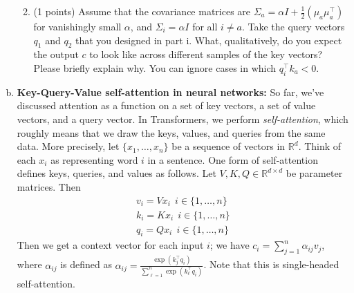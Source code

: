 \begin{enumerate}[(a)]
\begin{enumerate}[label=\roman*.]
    \begin{answer}
    \end{answer}

    \item (1 points) Assume that the covariance matrices are $\Sigma_a=\alpha I + \frac{1}{2}(\mu_a\mu_a^\top)$ for vanishingly small $\alpha$, and $\Sigma_i=\alpha I$  for all $i \neq a$.
    Take the query vectors $q_1$ and $q_2$ that you designed in part i.
    What, qualitatively, do you expect the output $c$ to look like across different samples of the key vectors? Please briefly explain why. You can ignore cases in which $q_i^\top k_a < 0$.

    \begin{answer}
    \end{answer}

    \end{enumerate}

\item {} \textbf{Key-Query-Value self-attention in neural networks:}
So far, we've discussed attention as a function on a set of key vectors, a set of value vectors, and a query vector.
In Transformers, we perform \textit{self-attention}, which roughly means that we draw the keys, values, and queries from the same data.
More precisely, let $\{x_1,\dots,x_n\}$ be a sequence of vectors in $\mathbb{R}^d$. 
Think of each $x_i$ as representing word $i$ in a sentence.
One form of self-attention defines keys, queries, and values as follows.
Let $V,K,Q \in \mathbb{R}^{d\times d}$ be parameter matrices. Then
\begin{align}
v_i = Vx_i\ \ i \in \{1,\dots,n\}\\
k_i = Kx_i\ \ i \in \{1,\dots,n\}\\
q_i = Qx_i\ \ i \in \{1,\dots,n\}
\end{align}
Then we get a context vector for each input $i$; we have $c_i = \sum_{j=1}^{n} \alpha_{ij} v_j$, where $\alpha_{ij}$ is defined as $\alpha_{ij} = \frac{\exp(k_j^\top q_i)}{\sum_{\ell=1}^{n}\exp(k_\ell^\top q_i)}$.
Note that this is single-headed self-attention.


\end{enumerate}
